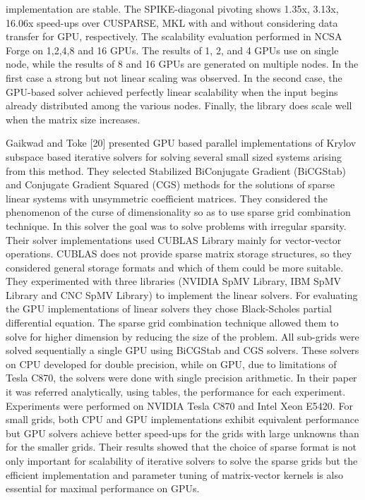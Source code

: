 implementation are stable. The SPIKE-diagonal pivoting shows 1.35x, 3.13x, 16.06x speed-ups over CUSPARSE, MKL with and without considering data transfer for GPU, respectively. The scalability evaluation performed in NCSA Forge on 1,2,4,8 and 16 GPUs. The results of 1, 2, and 4 GPUs use on single node, while the results of 8 and 16 GPUs are generated on multiple nodes. In the first case a strong but not linear scaling was observed. In the second case, the GPU-based solver achieved perfectly linear scalability when the input begins already distributed among the various nodes. Finally, the library does scale well when the matrix size increases.

Gaikwad and Toke [20] presented GPU based parallel implementations of Krylov subspace based iterative solvers for solving several small sized systems arising from this method. They selected Stabilized BiConjugate Gradient (BiCGStab) and Conjugate Gradient Squared (CGS) methods for the solutions of sparse linear systems with unsymmetric coefficient matrices. They considered the phenomenon of the curse of dimensionality so as to use sparse grid combination technique. In this solver the goal was to solve problems with irregular sparsity. Their solver implementations used CUBLAS Library mainly for vector-vector operations. CUBLAS does not provide sparse matrix storage structures, so they considered general storage formats and which of them could be more suitable. They experimented with three libraries (NVIDIA SpMV Library, IBM SpMV Library and CNC SpMV Library) to implement the linear solvers. For evaluating the GPU implementations of linear solvers they chose Black-Scholes partial differential equation. The sparse grid combination technique allowed them to solve for higher dimension by reducing the size of the problem. All sub-grids were solved sequentially a single GPU using BiCGStab and CGS solvers. These solvers on CPU developed for double precision, while on GPU, due to limitations of Tesla C870, the solvers were done with single precision arithmetic. In their paper it was referred analytically, using tables, the performance for each experiment. Experiments were performed on NVIDIA Tesla C870 and Intel Xeon E5420. For small grids, both CPU and GPU implementations exhibit equivalent performance but GPU solvers achieve better speed-ups for the grids with large unknowns than for the smaller grids. Their results showed that the choice of sparse format is not only important for scalability of iterative solvers to solve the sparse grids but the efficient implementation and parameter tuning of matrix-vector kernels is also essential for maximal performance on GPUs.

